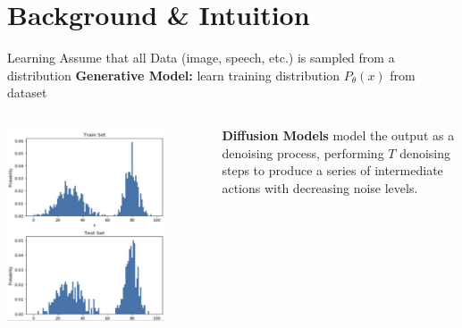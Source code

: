 \documentclass{beamer}
\begin{document}
\section{Background \& Intuition}

\begin{frame}{Learning}
    Assume that all Data (image, speech, etc.) is sampled from a distribution \newline \newline \pause 
    \textbf{Generative Model:} learn training distribution $P_{\theta}(x)$ from dataset
	\begin{columns}
		\begin{column}{.5\textwidth}
			\begin{center}
                \includegraphics[width=0.8\textwidth]{./img/distribution.png}
			\end{center} \pause
		\end{column}
		\hspace{0.5em}
		\begin{column}{.5\textwidth}
            \textbf{Diffusion Models} model the output as a denoising process, 
            performing $T$ denoising steps to produce a series of intermediate actions with decreasing noise levels.
		\end{column}
		\hspace{0.5em}
	\end{columns}
\end{frame}
\end{document}
